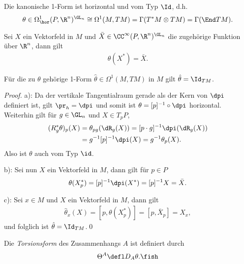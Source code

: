 \documentclass[%
	paper=a5,%
	fleqn,%
	DIV=18,%
	BCOR=0mm,
	fontsize=11pt,
	titlepage=false,%
	bibliography=totoc,
	DIV=18,%
	twoside=true,
	pdftitle=Riemannsche Geometrie,
	pdfauthor=Uwe Semmelmann,
	numbers=noendperiod]%
	{scrbook}
\begin{document}
\begin{lem}
\begin{propenum}
\item Die kanonische 1-Form ist horizontal und vom Typ $\Id$, d.h.
\begin{align*}
\theta\in \Omega^1_\hor(P,\R^n)^{\GL_n}\cong \Omega^1(M,TM) =
\Gamma(T^*M\otimes TM) = \Gamma(\End TM).
\end{align*}
\item Sei $X$ ein Vektorfeld in $M$ und $\bar{X}\in \CC^\infty(P,\R^n)^{\GL_n}$
die zugehörige Funktion über $\R^n$, dann gilt
\begin{align*}
\theta(X^*) = \bar{X}.
\end{align*}
\item Für die zu $\theta$ gehörige 1-Form $\hat{\theta}\in\Omega^1(M,TM)$
in $M$ gilt $\hat{\theta} = \Id_{TM}$.\fish
\end{propenum}
\end{lem}
\begin{proof}
a): Da der vertikale Tangentialraum gerade als der Kern von $\dpi$ definiert
ist, gilt $\pr_h = \dpi$ und somit ist $\theta=[p]^{-1}\circ\dpi$ horizontal.
Weiterhin gilt für $g\in \GL_n$ und $X\in T_pP$,
\begin{align*}
(R_g^*\theta)_p(X) &= \theta_{pg}(\dR_g(X)) = [p\cdot g]^{-1}\dpi(\dR_g(X))\\
&= g^{-1}[p]^{-1}\dpi(X)
= g^{-1}\theta_p(X).
\end{align*}
Also ist $\theta$ auch vom Typ $\id$.

b): Sei nun $X$ ein Vektorfeld in $M$, dann gilt für $p\in P$
\begin{align*}
\theta(X^*_p) = [p]^{-1}\dpi(X^*) = [p]^{-1} X = \bar{X}.
\end{align*}

c): Sei $x\in M$ und $X$ ein Vektorfeld in $M$, dann gilt
\begin{align*}
\hat{\theta}_x(X) = [p,\theta(X^*_p)] = 
[p,\bar{X}_p] = X_x,
\end{align*} 
und folglich ist $\hat{\theta}=\Id_{TM}$.\qed
\end{proof}

\begin{defn}
Die \emph{Torsionsform} des Zusammenhangs $A$ ist definiert durch
\begin{align*}
\Theta^A \defl D_A \theta.\fish
\end{align*}
\end{defn}
\end{document}

